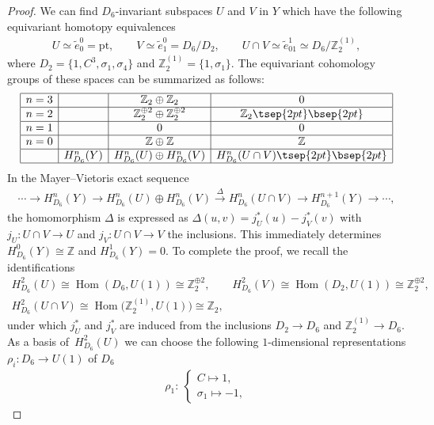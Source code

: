 \documentclass[pdftex]{sigma}
\theoremstyle{definition}
\newcommand{\Z}{\mathbb{Z}}
\newcommand{\pt}{\mathrm{pt}}
\begin{document}
\begin{proof}
We can f\/ind $D_6$-invariant subspaces $U$ and $V$ in $Y$ which have the following equivariant homotopy equivalences
\begin{gather*}
U \simeq \tilde{e}^0_0 = \pt, \qquad
V \simeq \tilde{e}^0_1 = D_6/D_2, \qquad
U \cap V \simeq \tilde{e}^1_{01} \simeq D_6/\Z_2^{(1)},
\end{gather*}
where $D_2 = \{ 1, C^3, \sigma_1, \sigma_4 \}$ and $\Z_2^{(1)} = \{ 1, \sigma_1 \}$. The equivariant cohomology groups of these spaces can be summarized as follows:
$$
\begin{array}{|c|c|c|c|}
\hline
n = 3 & & \Z_2 \oplus \Z_2 & 0 \\
\hline
n = 2 & & \Z_2^{\oplus 2} \oplus \Z_2^{\oplus 2} & \Z_2 \tsep{2pt}\bsep{2pt}\\
\hline
n = 1 & & 0 & 0 \\
\hline
n = 0 & & \Z \oplus \Z & \Z \\
\hline
& H^n_{D_6}(Y) & H^n_{D_6}(U) \oplus H^n_{D_6}(V) & H^n_{D_6}(U \cap V)\tsep{2pt}\bsep{2pt}\\
\hline
\end{array}
$$
In the Mayer--Vietoris exact sequence
\begin{gather*}
\cdots \to H^n_{D_6}(Y) \to H^n_{D_6}(U) \oplus H^n_{D_6}(V) \overset{\Delta}{\to} H^n_{D_6}(U \cap V) \to H^{n+1}_{D_6}(Y) \to \cdots,
\end{gather*}
the homomorphism $\Delta$ is expressed as $\Delta (u, v) = j_U^*(u) - j_V^*(v)$ with $j_U \colon U \cap V \to U$ and $j_V \colon U \cap V \to V$ the inclusions. This immediately determines $H^0_{D_6}(Y) \cong \Z$ and $H^1_{D_6}(Y) = 0$. To complete the proof, we recall the identif\/ications
\begin{gather*}
H^2_{D_6}(U) \cong \operatorname{Hom}(D_6, U(1)) \cong \Z_2^{\oplus 2}, \qquad
H^2_{D_6}(V) \cong \operatorname{Hom}(D_2, U(1)) \cong \Z_2^{\oplus 2}, \\
H^2_{D_6}(U \cap V) \cong \operatorname{Hom}\big(\Z_2^{(1)}, U(1)\big) \cong \Z_2,
\end{gather*}
under which $j_U^*$ and $j_V^*$ are induced from the inclusions $D_2 \to D_6$ and $\Z_2^{(1)} \to D_6$. As a basis of~$H^2_{D_6}(U)$ we can choose the following $1$-dimensional representations $\rho_i\colon D_6 \to U(1)$ of $D_6$
\begin{gather*}
\rho_1 \colon \
\begin{cases}
C \mapsto 1, \\
\sigma_1 \mapsto -1,
\end{cases}

\end{gather*}
\end{proof}
\end{document}
